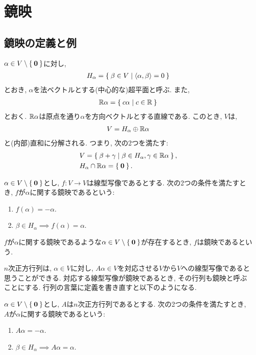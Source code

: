 \chapter{鏡映}

\section{鏡映の定義と例}


$\alpha \in V\setminus\Set{\boldsymbol{0}}$に対し,
\begin{align*}
  H_\alpha = \Set{\beta \in V | \Braket{\alpha,\beta}=0}
\end{align*}
とおき, $\alpha$を法ベクトルとする(中心的な)超平面と呼ぶ.
また,
\begin{align*}
  \mathbb{R}\alpha = \Set{c \alpha | c\in \mathbb{R}}
\end{align*}
とおく. $\mathbb{R}\alpha$は原点を通り$\alpha$を方向ベクトルとする直線である.
このとき, $V$は,
\begin{align*}
  V =   H_\alpha \oplus   \mathbb{R}\alpha
\end{align*}
と(内部)直和に分解される.
つまり, 次の2つを満たす:
\begin{align*}
  &V = \Set{ \beta + \gamma | \beta \in H_\alpha, \gamma \in \mathbb{R}\alpha},\\
  &H_\alpha \cap   \mathbb{R}\alpha =\Set{\boldsymbol{0}}.
\end{align*}

\begin{definition}
  $\alpha \in V\setminus\Set{\boldsymbol{0}}$とし,
  $f\colon V\to V$は線型写像であるとする.
  次の2つの条件を満たすとき,
  $f$が$\alpha$に関する鏡映であるという:
  \begin{enumerate}
  \item $f(\alpha)=-\alpha$.
  \item $\beta \in H_\alpha \implies f(\alpha)=\alpha$.    
  \end{enumerate}
  $f$が$\alpha$に関する鏡映であるような$\alpha\in V\setminus\Set{\boldsymbol{0}}$が存在するとき,
  $f$は鏡映であるという.
\end{definition}
$n$次正方行列は,
$\alpha\in V$に対し,
$A\alpha\in V$を対応させる$V$から$V$への線型写像であると思うことができる.
対応する線型写像が鏡映であるとき, その行列も鏡映と呼ぶことにする.
行列の言葉に定義を書き直すと以下のようになる.
\begin{definition}
  $\alpha \in V\setminus\Set{\boldsymbol{0}}$とし,
  $A$は$n$次正方行列であるとする.
  次の2つの条件を満たすとき,
  $A$が$\alpha$に関する鏡映であるという:
  \begin{enumerate}
  \item $A\alpha=-\alpha$.
  \item $\beta \in H_\alpha \implies A\alpha=\alpha$.    
  \end{enumerate}
\end{definition}

